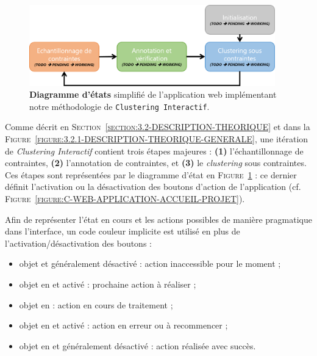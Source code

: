 		\begin{figure}[H]
			\centering
			\includegraphics[width=0.95\textwidth]{figures/interactive-clustering-application-diagramme-etats}
			\caption{
				\textbf{Diagramme d'états} simplifié de l'application web implémentant notre méthodologie de \texttt{Clustering Interactif}.
			}
			\label{figure:C-WEB-APPLICATION-DIAGRAMME-ETATS}
		\end{figure}
		
		Comme décrit en \textsc{Section~\ref{section:3.2-DESCRIPTION-THEORIQUE}} et dans la \textsc{Figure~\ref{figure:3.2.1-DESCRIPTION-THEORIQUE-GENERALE}}, une itération de \textit{Clustering Interactif} contient trois étapes majeures : \textbf{(1)} l'échantillonnage de contraintes, \textbf{(2)} l'annotation de contraintes, et \textbf{(3)} le \textit{clustering} sous contraintes.
		Ces étapes sont représentées par le diagramme d'état en \textsc{Figure~\ref{figure:C-WEB-APPLICATION-DIAGRAMME-ETATS}} : ce dernier définit l'activation ou la désactivation des boutons d'action de l'application (cf. \textsc{Figure~\ref{figure:C-WEB-APPLICATION-ACCUEIL-PROJET}}).
		
		Afin de représenter l'état en cours et les actions possibles de manière pragmatique dans l'interface, un code couleur implicite est utilisé en plus de l'activation/désactivation des boutons :
		\begin{itemize}
			\item objet  et généralement désactivé : action inaccessible pour le moment ;
			\item objet en  et activé : prochaine action à réaliser ;
			\item objet en  : action en cours de traitement ;
			\item objet en  et activé : action en erreur ou à recommencer ;
			\item objet en  et généralement désactivé : action réalisée avec succès.
		\end{itemize}
		
